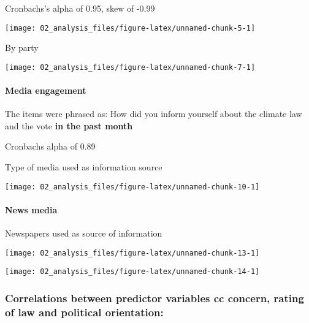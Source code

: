 \documentclass[
]{article}
\begin{document}
Cronbachs's alpha of 0.95, skew of -0.99

\begin{center}\texttt{[image: 02\_analysis\_files/figure-latex/unnamed-chunk-5-1]} \end{center}

By party

\begin{center}\texttt{[image: 02\_analysis\_files/figure-latex/unnamed-chunk-7-1]} \end{center}

\hypertarget{media-engagement}{%
\paragraph{Media engagement}\label{media-engagement}}

The items were phrased as: How did you inform yourself about the climate
law and the vote \textbf{in the past month}

Cronbachs alpha of 0.89

Type of media used as information source

\begin{center}\texttt{[image: 02\_analysis\_files/figure-latex/unnamed-chunk-10-1]} \end{center}

\hypertarget{news-media}{%
\paragraph{News media}\label{news-media}}

Newspapers used as source of information

\begin{center}\texttt{[image: 02\_analysis\_files/figure-latex/unnamed-chunk-13-1]} \end{center}

\begin{center}\texttt{[image: 02\_analysis\_files/figure-latex/unnamed-chunk-14-1]} \end{center}

\hypertarget{correlations-between-predictor-variables-cc-concern-rating-of-law-and-political-orientation}{%
\subsubsection{Correlations between predictor variables cc concern,
rating of law and political
orientation:}\label{correlations-between-predictor-variables-cc-concern-rating-of-law-and-political-orientation}}
\end{document}
